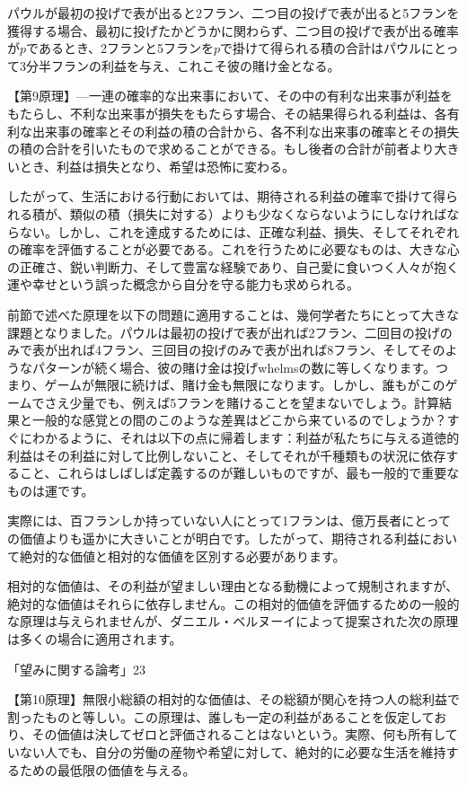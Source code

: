 \documentclass[a4paper,11pt,openany]{ltjsbook}
\begin{document}
パウルが最初の投げで表が出ると2フラン、二つ目の投げで表が出ると5フランを獲得する場合、最初に投げたかどうかに関わらず、二つ目の投げで表が出る確率が$p$であるとき、2フランと5フランを$p$で掛けて得られる積の合計はパウルにとって3分半フランの利益を与え、これこそ彼の賭け金となる。

【第9原理】—一連の確率的な出来事において、その中の有利な出来事が利益をもたらし、不利な出来事が損失をもたらす場合、その結果得られる利益は、各有利な出来事の確率とその利益の積の合計から、各不利な出来事の確率とその損失の積の合計を引いたもので求めることができる。もし後者の合計が前者より大きいとき、利益は損失となり、希望は恐怖に変わる。

したがって、生活における行動においては、期待される利益の確率で掛けて得られる積が、類似の積（損失に対する）よりも少なくならないようにしなければならない。しかし、これを達成するためには、正確な利益、損失、そしてそれぞれの確率を評価することが必要である。これを行うために必要なものは、大きな心の正確さ、鋭い判断力、そして豊富な経験であり、自己愛に食いつく人々が抱く運や幸せという誤った概念から自分を守る能力も求められる。

前節で述べた原理を以下の問題に適用することは、幾何学者たちにとって大きな課題となりました。パウルは最初の投げで表が出れば2フラン、二回目の投げのみで表が出れば4フラン、三回目の投げのみで表が出れば8フラン、そしてそのようなパターンが続く場合、彼の賭け金は投げwhelmsの数に等しくなります。つまり、ゲームが無限に続けば、賭け金も無限になります。しかし、誰もがこのゲームでさえ少量でも、例えば5フランを賭けることを望まないでしょう。計算結果と一般的な感覚との間のこのような差異はどこから来ているのでしょうか？すぐにわかるように、それは以下の点に帰着します：利益が私たちに与える道徳的利益はその利益に対して比例しないこと、そしてそれが千種類もの状況に依存すること、これらはしばしば定義するのが難しいものですが、最も一般的で重要なものは運です。

実際には、百フランしか持っていない人にとって1フランは、億万長者にとっての価値よりも遥かに大きいことが明白です。したがって、期待される利益において絶対的な価値と相対的な価値を区別する必要があります。

相対的な価値は、その利益が望ましい理由となる動機によって規制されますが、絶対的な価値はそれらに依存しません。この相対的価値を評価するための一般的な原理は与えられませんが、ダニエル・ベルヌーイによって提案された次の原理は多くの場合に適用されます。

「望みに関する論考」23

【第10原理】無限小総額の相対的な価値は、その総額が関心を持つ人の総利益で割ったものと等しい。この原理は、誰しも一定の利益があることを仮定しており、その価値は決してゼロと評価されることはないという。実際、何も所有していない人でも、自分の労働の産物や希望に対して、絶対的に必要な生活を維持するための最低限の価値を与える。
\end{document}
